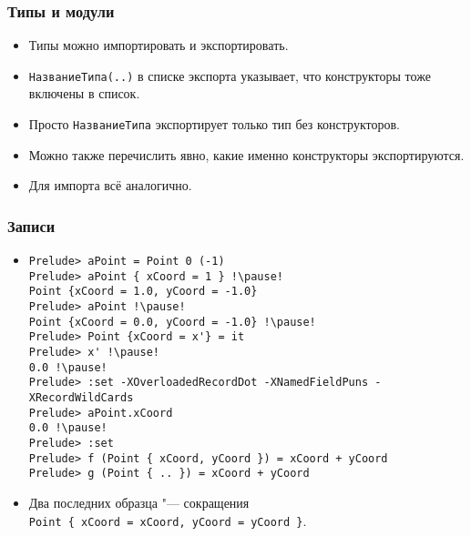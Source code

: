 \documentclass[10pt]{beamer}
\begin{document}
\begin{frame}[fragile]
\frametitle{Типы и модули}
\begin{itemize}
    \item Типы можно импортировать и экспортировать.
    \item \lstinline|НазваниеТипа(..)| в списке экспорта указывает, что конструкторы тоже включены в список.
    \item Просто \lstinline|НазваниеТипа| экспортирует только тип без конструкторов.
    \item Можно также перечислить явно, какие именно конструкторы экспортируются.
    \item Для импорта всё аналогично.
\end{itemize}
\end{frame}

\begin{frame}[fragile]
\frametitle{Записи}\hypertarget{rec2}{}
\hyperlink{rec1}{}
\begin{itemize}
\item 
\begin{lstlisting}[basicstyle=\ttfamily\footnotesize]
Prelude> aPoint = Point 0 (-1)
Prelude> aPoint { xCoord = 1 } !\pause!
Point {xCoord = 1.0, yCoord = -1.0}
Prelude> aPoint !\pause!
Point {xCoord = 0.0, yCoord = -1.0} !\pause!
Prelude> Point {xCoord = x'} = it
Prelude> x' !\pause!
0.0 !\pause!
Prelude> :set -XOverloadedRecordDot -XNamedFieldPuns -XRecordWildCards
Prelude> aPoint.xCoord
0.0 !\pause!
Prelude> :set 
Prelude> f (Point { xCoord, yCoord }) = xCoord + yCoord
Prelude> g (Point { .. }) = xCoord + yCoord
\end{lstlisting}
\item Два последних образца "--- сокращения\\ \lstinline[basicstyle=\ttfamily\small]|Point { xCoord = xCoord, yCoord = yCoord }|.
\end{itemize}
\end{frame}
\end{document}
